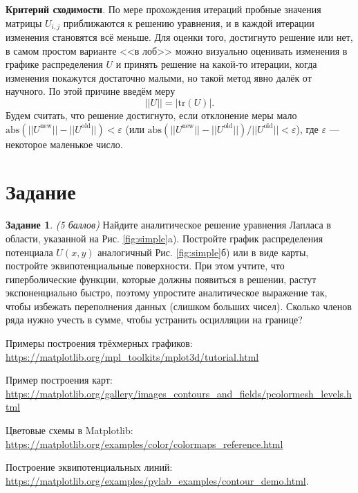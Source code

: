 \documentclass[12pt]{article}
\newcommand{\task}[2]{\vspace{6pt}
\textbf{Задание #1}. #2 \vspace{6pt}}
\begin{document}
\textbf{Критерий сходимости}. По мере прохождения итераций пробные значения матрицы $U_{i,j}$ приближаются к решению уравнения, и в каждой итерации изменения становятся всё меньше. Для оценки того, достигнуто решение или нет, в самом простом варианте <<в лоб>> можно визуально оценивать изменения в графике распределения $U$ и принять решение на какой-то итерации, когда изменения покажутся достаточно малыми, но такой метод явно далёк от научного. По этой причине введём меру
%
\begin{equation}
||U||=|\textrm{tr}(U)|.
\end{equation}
%
Будем считать, что решение достигнуто, если отклонение меры мало $\text{abs}\left(||U^\text{new}||-||U^\text{old}||\right)<\varepsilon$ (или $\text{abs}\left(||U^\text{new}||-||U^\text{old}||\right)/||U^\text{old}||<\varepsilon$), где $\varepsilon$ --- некоторое маленькое число.


\section*{Задание}
\task{1}{\textit{(5 баллов)} Найдите аналитическое решение уравнения Лапласа в области, указанной на Рис. \ref{fig:simple}a). Постройте график распределения потенциала $U(x,y)$ аналогичный Рис. \ref{fig:simple}б) или в виде карты, постройте эквипотенциальные поверхности. При этом учтите, что гиперболические функции, которые должны появиться в решении, растут экспоненциально быстро, поэтому упростите аналитическое выражение так, чтобы избежать переполнения данных (слишком больших чисел). Сколько членов ряда нужно учесть в сумме, чтобы устранить осцилляции на границе?

Примеры построения трёхмерных графиков: \url{https://matplotlib.org/mpl_toolkits/mplot3d/tutorial.html}

Пример построения карт: \url{https://matplotlib.org/gallery/images_contours_and_fields/pcolormesh_levels.html}

Цветовые схемы в Matplotlib: \url{https://matplotlib.org/examples/color/colormaps_reference.html}

Построение эквипотенциальных линий: \url{https://matplotlib.org/examples/pylab_examples/contour_demo.html}.
}
\end{document}
